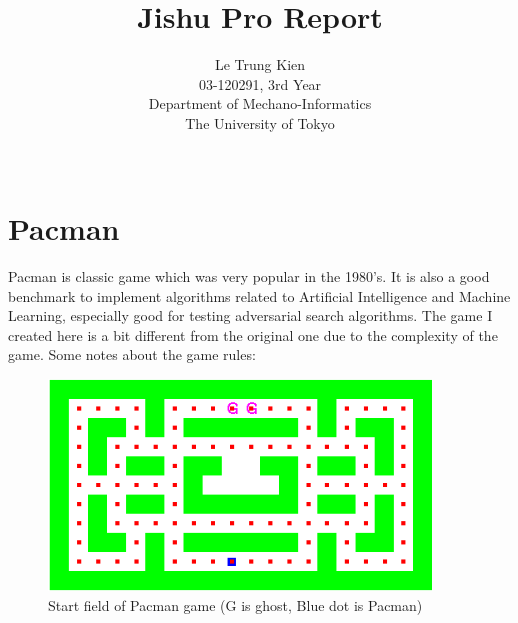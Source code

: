 \documentclass[a4paper, 11pt]{article}
\begin{document}
\title{Jishu Pro Report}
\author{Le Trung Kien\\ 
  03-120291, 3rd Year \\
  Department of Mechano-Informatics \\ 
  The University of Tokyo \\ \\
}
\maketitle
\tableofcontents

\newpage
\section{Pacman}

Pacman is classic game which was very popular in the 1980's. It is also a good benchmark to implement algorithms related to Artificial Intelligence and Machine Learning, especially good for testing adversarial search algorithms. The game I created here is a bit different from the original one due to the complexity of the game. Some notes about the game rules:
\begin{figure}[hbt]
  \centering
  \includegraphics[width=4in]{field1-start}
  \caption[Close up of \textit{Hemidactylus} sp.]
  {Start field of Pacman game (G is ghost, Blue dot is Pacman)}
\end{figure}
\end{document}
